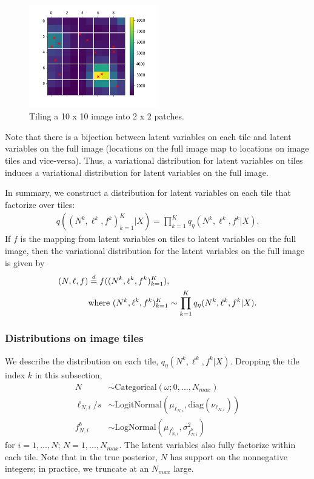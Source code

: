 \begin{figure}[h]
    \centering
    \includegraphics[width = 0.5\textwidth]{figures/example_tiled.png}
    \vspace{-1cm}
    \caption{Tiling a 10 x 10 image into 2 x 2 patches. }
    \label{fig:ex_tiles}
\end{figure}

Note that there is a bijection between latent variables on each tile and latent variables on the full image (locations on the full image map to locations on image tiles and vice-versa). Thus, a variational distribution for latent variables on tiles induces a variational distribution for latent variables on the full image. 

In summary, 
we construct a distribution for latent variables on each tile that factorize over tiles: 
\begin{align}
    q((N^k, \ell^k, f^k)_{k = 1}^K|X) = \prod_{k = 1}^K q_\eta(N^k, \ell^k, f^k | X). 
\end{align}
If $f$ is the mapping from latent variables on tiles to latent variables on the full image, then the variational distribution for the latent variables on the full image is given by 
\begin{align}
    (N, \ell, f) &\stackrel{d}{=} f((N^k, \ell^k, f^k)_{k = 1}^K), \notag \\  
        &\text{where } (N^k, \ell^k, f^k)_{k = 1}^K \sim \prod_{k = 1}^K q_\eta(N^k, \ell^k, f^k | X). 
\end{align}

\subsubsection{Distributions on image tiles}
We describe the distribution on each tile, $q_\eta(N^k, \ell^k, f^k | X)$. 
Dropping the tile index $k$ in this subsection,
\begin{align}
    N &\sim \text{Categorical}(\omega; 0, ..., N_{max}) \label{eq:var_distr_n}\\
	\ell_{N, i} / s &\sim \text{LogitNormal}(\mu_{\ell_{N, i}}, \text{diag}(\nu_{\ell_{N, i}}) )\label{eq:var_distr_loc}\\
	f^b_{N, i} &\sim \text{LogNormal}(\mu_{f^b_{N, i}}, \sigma^2_{f^b_{N, i}}) \label{eq:var_distr_f}
\end{align}
for $i = 1, ..., N$; $N = 1, ..., N_{max}$. The latent variables also fully factorize within each tile. Note that in the true posterior, $N$ has support on the nonnegative integers; in practice, we truncate at an $N_{max}$ large. 

